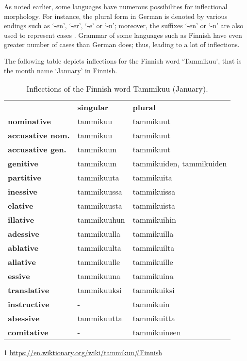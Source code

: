 As noted earlier, some languages have numerous possibilites for inflectional morphology. For instance, the plural form in German is denoted by various endings such as `-en', `-er', `-e' or `-n'; moreover, the suffixes `-en' or `-n' are also used to represent cases \cite{indurkhya2010handbook}. Grammar of some languages such as Finnish have even greater number of cases than German does; thus, leading to a lot of inflections. 

The following table depicts inflections for the Finnish word `Tammikuu', that is the month name `January' in Finnish. 

\begin{table}[H] \label{the-inflection-table-tammikuu}
	\centering
	\begin{threeparttable}
		\begin{tabularx}{\linewidth}{||>{\raggedright\arraybackslash}p{1.5in}| >{\raggedright\arraybackslash}X >{\raggedright\arraybackslash}X||} 
			\hline
			\multicolumn{3}{|l|}{\textbf{Inflection of tammikuu\tnote{1}} } \\
			\hline\hline
			\textbf{} & \textbf{singular} & \textbf{plural} \\
			\textbf{nominative} & tammikuu  & tammikuut \\
			\textbf{accusative nom.} & tammikuu  & tammikuut \\
			\textbf{accusative gen.} & tammikuun  & tammikuut \\
			\textbf{genitive} & tammikuun  & tammikuiden, tammikuiden \\
			\textbf{partitive} & tammikuuta  & tammikuita \\
			\textbf{inessive} & tammikuussa  & tammikuissa \\
			\textbf{elative} & tammikuusta  & tammikuista \\
			\textbf{illative} & tammikuuhun  & tammikuihin \\
			\textbf{adessive} & tammikuulla  & tammikuilla \\
			\textbf{ablative} & tammikuulta  & tammikuilta \\
			\textbf{allative} & tammikuulle  & tammikuille \\
			\textbf{essive} & tammikuuna  & tammikuina \\
			\textbf{translative} & tammikuuksi  & tammikuiksi \\
			\textbf{instructive} & - & tammikuin \\
			\textbf{abessive} & tammikuutta  & tammikuitta \\
			\textbf{comitative} & -  & tammikuineen \\ [1ex]
			\hline
		\end{tabularx}
		\begin{tablenotes}
			\item[1] \url{https://en.wiktionary.org/wiki/tammikuu#Finnish}
		\end{tablenotes}
	\end{threeparttable}
	\caption{Inflections of the Finnish word Tammikuu (January).}
	\label{table:1f}
\end{table}

